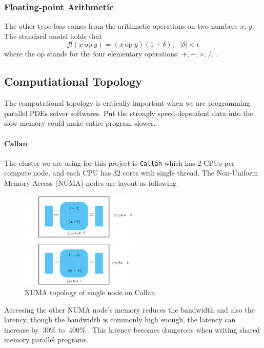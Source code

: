 \subsubsection{Floating-point Arithmetic}
The other type loss comes from the arithmetic operations on two numbers $x$, $y$. 
The standard model holds that 
\begin{equation}
  fl(x \:\text{op}\: y) = (x \: \text{op} \: y) (1+\delta), \:\:\: \left|\delta\right| < \epsilon
\end{equation}
where the op stands for the four elementary operations: $+, -, \times, /$. \cite{Germund,NMSC,V1,P112}.


\subsection{Computiational Topology}
The computational topology is critically important when we are programming parallel PDEs solver softwares.
Put the strongly speed-dependent data into the slow memory could make entire program slower.

\paragraph{Callan}
The cluster we are using for this project is \texttt{Callan} \cite{Callan_TCD} which has 
$2$ CPUs per compute node, and each CPU has $32$ cores with single thread. 
The Non-Uniform Memory Access (NUMA) nodes are layout as following 
\begin{figure}[htbp]
  \centering
  \includegraphics[width=0.5\textwidth]{figure/FIG_Topology_Callan.jpg}
  \caption{NUMA topology of single node on Callan}
  \label{FIG_Topology_Callan}
\end{figure}
Accessing the other NUMA node's memory reduces the bandwidth and also the latency,
though the bandwidth is commonly high enough, the latency can increase by 
$~30\%$ to $~400\%$ \cite{NUMA_Latency_TCD}. 
This latency becomes dangerous when writing shared memory parallel programs.
